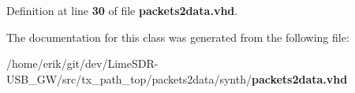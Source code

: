 Definition at line {\bf 30} of file {\bf packets2data.\+vhd}.



The documentation for this class was generated from the following file\+:\begin{DoxyCompactItemize}
\item 
/home/erik/git/dev/\+Lime\+S\+D\+R-\/\+U\+S\+B\+\_\+\+G\+W/src/tx\+\_\+path\+\_\+top/packets2data/synth/{\bf packets2data.\+vhd}\end{DoxyCompactItemize}
